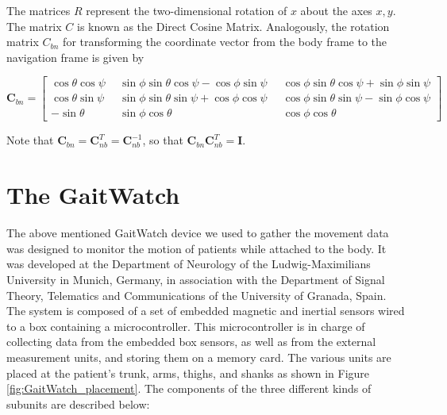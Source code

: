 \noindent
The matrices $R$ represent the two-dimensional rotation of $x$ about the axes $x, y$. The matrix $C$ is known as the Direct Cosine Matrix. Analogously, the rotation matrix $C_{bn}$ for transforming the coordinate vector from the body frame to the navigation frame is given by

\begin{equation}
\mathbf{C}_{bn} = {\left[\begin{smallmatrix}
   \cos \theta \cos \psi \; &
    \sin \phi \sin \theta \cos \psi - \cos \phi \sin \psi \; &
    \cos \phi \sin \theta \cos \psi + \sin \phi \sin \psi \\
    \cos \theta \sin \psi \;\; &
    \sin \phi \sin \theta \sin \psi + \cos \phi \cos \psi \;\; &
    \cos \phi \sin \theta \sin \psi - \sin \phi \cos \psi \\
    -\sin \theta \;\; &
    \sin \phi \cos \theta \;\; &
    \cos \phi \cos \theta
  \end{smallmatrix}\right]}
\end{equation}

\noindent
Note that $\mathbf{C}_{bn} = \mathbf{C}^T_{nb} = \mathbf{C}^{-1}_{nb}$, so that $\mathbf{C}^{ }_{bn} \mathbf{C}^T_{nb} = \mathbf{I}$.  

\section{The GaitWatch}

The above mentioned GaitWatch device we used to gather the movement data was designed to monitor the motion of patients while attached to the body. It was developed at the Department of Neurology of the Ludwig-Maximilians University in Munich, Germany, in association with the Department of Signal Theory, Telematics and Communications of the University of Granada, Spain. The system is composed of a set of embedded magnetic and inertial sensors wired to a box containing a microcontroller. This microcontroller is in charge of collecting data from the embedded box sensors, as well as from the external measurement units, and storing them on a memory card. The various units are placed at the patient's trunk, arms, thighs, and shanks as shown in Figure \ref{fig:GaitWatch_placement}. The components of the three different kinds of subunits are described below:


